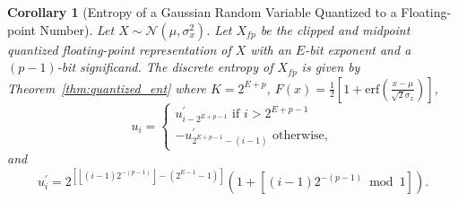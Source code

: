 \documentclass[12pt,onecolumn, margin=1in]{IEEEtran}
\newtheorem{corollary}{Corollary}[theorem]
\newcommand{\bracket}[1]{\left[ #1 \right]}
\newcommand{\paren}[1]{\left( #1 \right)}
\newcommand{\gauss}[2]{\mathcal{N}\paren{#1, #2}}
\newcommand{\sigx}{\sigma_x}
\newcommand{\erf}{\mathrm{erf}}
\begin{document}
\begin{corollary}[Entropy of a Gaussian Random Variable Quantized to a Floating-point Number]\label{cor:gauss_fp_ent}
Let $X \sim \gauss{\mu}{\sigx^2}$. Let $X_{fp}$ be the clipped and midpoint quantized floating-point representation of $X$ with an $E$-bit exponent and a $(p-1)$-bit significand. The discrete entropy of $X_{fp}$ is given by Theorem~\ref{thm:quantized_ent} where $K = 2^{E + p}$, $F(x) = \frac{1}{2}\bracket{1 + \erf\paren{\frac{x -\mu}{\sqrt{2}\sigx}}}$,
\begin{equation*}
    u_i = \begin{cases}
    u^\prime_{i -2^{E + p - 1}}  \text{ if } i > 2^{E + p - 1}\\
    -u^\prime_{2^{E + p - 1} - (i-1)} \text{ otherwise},
\end{cases}
\end{equation*}
and 
\begin{equation*}
    u^\prime_i = 2^{\bracket{\left\lfloor (i-1)2^{-(p-1)}\right\rfloor - \paren{2^{E-1} - 1}}}\paren{1 + \bracket{(i-1)2^{-(p-1)} \bmod 1}}.
\end{equation*}
\end{corollary}
\end{document}
